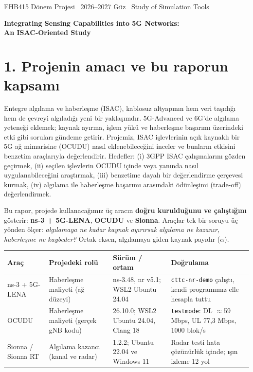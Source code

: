 \documentclass[10.5pt,a4paper]{article}
\begin{document}
\begin{center}
{\sffamily\color{muted}\small EHB415 Dönem Projesi \textbullet\ 2026--2027 Güz \textbullet\ Study of Simulation Tools\par}
\vspace{6pt}
{\sffamily\bfseries\LARGE Integrating Sensing Capabilities into 5G Networks:\\ An ISAC-Oriented Study\par}
\vspace{8pt}
{\sffamily\small \taha \quad \aziz\par \fatih \quad \nihat\par}
\end{center}
\vspace{-4pt}{\color{acc!40}\rule{\textwidth}{0.8pt}}

\section*{1. Projenin amacı ve bu raporun kapsamı}
Entegre algılama ve haberleşme (ISAC), kablosuz altyapının hem veri taşıdığı hem de çevreyi algıladığı yeni bir yaklaşımdır. 5G-Advanced ve 6G'de algılama yeteneği eklemek; kaynak ayırma, işlem yükü ve haberleşme başarımı üzerindeki etki gibi soruları gündeme getirir. Projemiz, ISAC işlevlerinin açık kaynaklı bir 5G ağ mimarisine (OCUDU) nasıl eklenebileceğini inceler ve bunların etkisini benzetim araçlarıyla değerlendirir. Hedefler: (i) 3GPP ISAC çalışmalarını gözden geçirmek, (ii) seçilen işlevlerin OCUDU içinde veya yanında nasıl uygulanabileceğini araştırmak, (iii) benzetime dayalı bir değerlendirme çerçevesi kurmak, (iv) algılama ile haberleşme başarımı arasındaki ödünleşimi (trade-off) değerlendirmek.

Bu rapor, projede kullanacağımız üç aracın \textbf{doğru kurulduğunu ve çalıştığını} gösterir: \textbf{ns-3 + 5G-LENA}, \textbf{OCUDU} ve \textbf{Sionna}. Araçlar tek bir soruyu üç yönden ölçer: \emph{algılamaya ne kadar kaynak ayırırsak algılama ne kazanır, haberleşme ne kaybeder?} Ortak eksen, algılamaya giden kaynak payıdır ($\alpha$).

\begin{center}\sffamily\small
\begin{tabular}{@{}p{2.6cm}p{3.3cm}p{3.3cm}p{4.2cm}@{}}
\toprule
\textbf{Araç} & \textbf{Projedeki rolü} & \textbf{Sürüm / ortam} & \textbf{Doğrulama} \\
\midrule
ns-3 + 5G-LENA & Haberleşme maliyeti (ağ düzeyi) & ns-3.48, nr v5.1; WSL2 Ubuntu 24.04 & \texttt{cttc-nr-demo} çalıştı, kendi programımız elle hesapla tuttu \\
OCUDU & Haberleşme maliyeti (gerçek gNB kodu) & 26.10.0; WSL2 Ubuntu 24.04, Clang 18 & \texttt{testmode}: DL $\approx$59 Mbps, UL 77,3 Mbps, 1000 blok/s \\
Sionna / Sionna RT & Algılama kazancı (kanal ve radar) & 1.2.2; Ubuntu 22.04 ve Windows 11 & Radar testi hata çözünürlük içinde; ışın izleme 12 yol \\
\bottomrule
\end{tabular}
\end{center}
\end{document}
